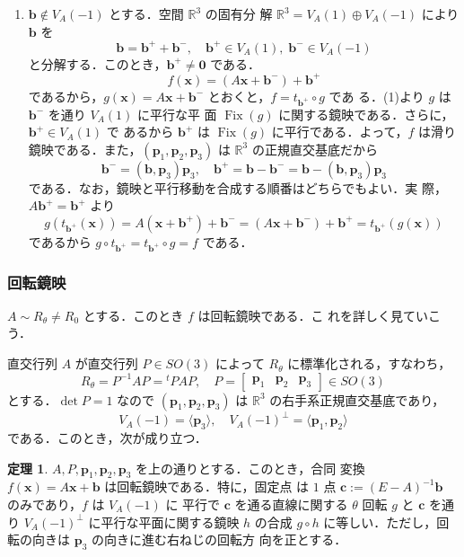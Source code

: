 \documentclass[11pt, uplatex, dvipdfmx, titlepage]{jsarticle}
\makeatletter
\DeclareMathOperator{\Fix}{Fix}
\renewenvironment{proof}[1][\proofname]{\par
  \pushQED{\qed}%
  \normalfont \topsep6\p@\@plus6\p@\relax
  \trivlist
  \item[\hskip\labelsep
         \bfseries
    {#1}]\ignorespaces
}{%
  \popQED\endtrivlist\@endpefalse
}
\theoremstyle{definition}
\newtheorem{theorem}{定理}[section]
\renewcommand{\proofname}{\textbf{証明}}
\makeatother
\begin{document}
\begin{proof}[定理\ref{thm:RefOrGlide3}の証明]
\begin{enumerate}[(1)]
  \item $\bm{b} \notin V_A(-1)$ とする．空間 $\mathbb{R}^3$ の固有分
    解 $\mathbb{R}^3 = V_A(1) \oplus V_A(-1)$ により $\bm{b}$ を
    \[
      \bm{b} = \bm{b}^{+} + \bm{b}^{-}, \quad \bm{b}^{+} \in V_A(1),
      \; \bm{b}^{-} \in V_A(-1)
    \]
    と分解する．このとき，$\bm{b}^{+} \neq \bm{0}$ である．
    \[
      f(\bm{x}) = \left(A\bm{x} + \bm{b}^{-}\right) + \bm{b}^{+}
    \]
    であるから，$g(\bm{x}) = A\bm{x} + \bm{b}^{-}$
    とおくと，$f = t_{\bm{b}^{+}} \circ g$ であ
    る．(1)より $g$ は $\bm{b}^{-}$ を通り $V_A(1)$ に平行な平
    面 $\Fix(g)$ に関する鏡映である．さらに，$\bm{b}^{+} \in V_A(1)$ で
    あるから $\bm{b}^{+}$ は $\Fix(g)$ に平行である．よって，$f$ は滑り
    鏡映である．また，$(\bm{p}_1, \bm{p}_2,
    \bm{p}_3)$ は $\mathbb{R}^3$ の正規直交基底だから
    \[
      \bm{b}^{-} = (\bm{b}, \bm{p}_3)\bm{p}_3, \quad
      \bm{b}^{+}=\bm{b}-\bm{b}^{-}=\bm{b}-(\bm{b},\bm{p}_3)\bm{p}_3
    \]
    である．なお，鏡映と平行移動を合成する順番はどちらでもよい．実
    際，$A\bm{b}^{+}=\bm{b}^{+}$ より
    \[
      g\left(t_{\bm{b}^{+}}(\bm{x})\right) = A\left(\bm{x}+\bm{b}^{+}\right)+\bm{b}^{-}
      = \left(A\bm{x}+\bm{b}^{-}\right) + \bm{b}^{+} = t_{\bm{b}^{+}}\left( g(\bm{x})\right)
    \]
    であるから $g\circ t_{\bm{b}^{+}} = t_{\bm{b}^{+}}\circ g=f$ である．
  \end{enumerate}
\end{proof}


\subsubsection{回転鏡映}

$A \sim R_{\theta} \neq R_0$ とする．このとき $f$ は回転鏡映である．こ
れを詳しく見ていこう．

直交行列 $A$ が直交行列 $P \in SO(3)$ によって $R_{\theta}$ に標準化される，すなわち，
\[
  R_{\theta}=P^{-1}AP = {}^{t}PAP, \quad P=\left[
    \begin{array}{ccc}
      \bm{p}_1 & \bm{p}_2 & \bm{p}_3
    \end{array}
  \right] \in SO(3)
\]
とする．$\det P=1$ なので $(\bm{p}_1, \bm{p}_2,
\bm{p}_3)$ は $\mathbb{R}^3$ の右手系正規直交基底であり，
\[
  V_A(-1) = \langle \bm{p}_3\rangle, \quad V_A(-1)^{\perp}=\langle
  \bm{p}_1, \bm{p}_2\rangle
\]
である．このとき，次が成り立つ．

\begin{theorem}\label{thm:rotref3}
  $A, P, \bm{p}_1, \bm{p}_2, \bm{p}_3$ を上の通りとする．このとき，合同
  変換 $f(\bm{x}) = A\bm{x}+\bm{b}$ は回転鏡映である．特に，固定点
  は $1$ 点 $\bm{c}:=(E-A)^{-1}\bm{b}$ のみであり，$f$ は $V_A(-1)$ に
  平行で $\bm{c}$ を通る直線に関する $\theta$ 回転 $g$ と $\bm{c}$ を通
  り $V_A(-1)^{\perp}$ に平行な平面に関する鏡映 $h$ の合成 $g \circ h$
  に等しい．ただし，回転の向きは $\bm{p}_3$ の向きに進む右ねじの回転方
  向を正とする．
\end{theorem}
\end{document}
